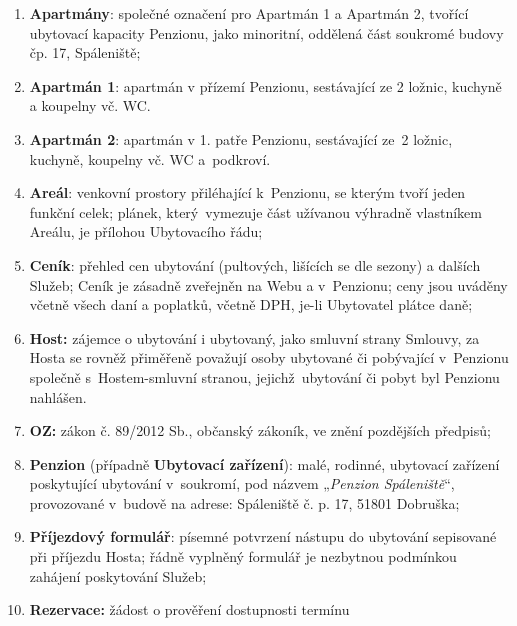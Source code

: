 \documentclass[a4paper]{scrartcl}
\begin{document}
\begin{enumerate}
\begin{enumerate}
          \item
                \textbf{Apartmány}: společné označení pro Apartmán 1 a Apartmán 2,
                tvořící ubytovací kapacity Penzionu, jako minoritní, oddělená část
                soukromé budovy čp. 17, Spáleniště;
          \item
                \textbf{Apartmán 1}: apartmán v přízemí Penzionu, sestávající ze 2
                ložnic, kuchyně a koupelny vč. WC.
          \item
                \textbf{Apartmán 2}: apartmán v 1. patře Penzionu, sestávající
                ze~2 ložnic, kuchyně, koupelny vč. WC a~podkroví.
          \item
                \textbf{Areál}: venkovní prostory přiléhající k~Penzionu, se
                kterým tvoří jeden funkční celek; plánek, který~vymezuje část
                užívanou výhradně vlastníkem Areálu, je přílohou Ubytovacího řádu;
          \item
                \textbf{Ceník}: přehled cen ubytování (pultových, lišících se dle
                sezony) a dalších Služeb; Ceník je zásadně zveřejněn na Webu a
                v~Penzionu; ceny jsou uváděny včetně všech daní a poplatků, včetně
                DPH, je-li Ubytovatel plátce daně;
          \item
                \textbf{Host:} zájemce o ubytování i ubytovaný, jako smluvní
                strany Smlouvy, za Hosta se rovněž přiměřeně považují osoby
                ubytované či pobývající v~Penzionu společně s~Hostem-smluvní
                stranou, jejichž~ubytování či pobyt byl Penzionu nahlášen.
          \item
                \textbf{OZ:} zákon č. 89/2012 Sb., občanský zákoník, ve znění
                pozdějších předpisů;
          \item
                \textbf{Penzion} (případně \textbf{Ubytovací zařízení}): malé,
                rodinné, ubytovací zařízení poskytující ubytování v~soukromí, pod
                názvem „\emph{Penzion Spáleniště}``, provozované v~budově na
                adrese: Spáleniště č. p. 17, 51801 Dobruška;
          \item
                \textbf{Příjezdový formulář}: písemné potvrzení nástupu do
                ubytování sepisované při příjezdu Hosta; řádně vyplněný formulář
                je nezbytnou podmínkou zahájení poskytování Služeb;
          \item
                \textbf{Rezervace:} žádost o prověření dostupnosti termínu

\end{enumerate}
\end{enumerate}
\end{document}
